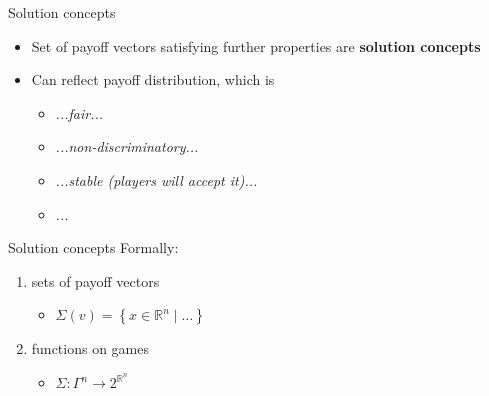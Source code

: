 \documentclass{beamer}
\newcommand{\Rn}[1][n]{\mathbb{R}^{#1}}
\begin{document}

\begin{frame}{Solution concepts}
	\begin{itemize}
	    \item<2-> Set of payoff vectors satisfying further properties are \textbf{solution concepts}
	    \item<3-> Can reflect payoff distribution, which is
	    \begin{itemize}
	        \item<4-> \textit{...fair...}
	        \item<4-> \textit{...non-discriminatory...}
	        \item<4-> \textit{...stable (players will accept it)...} 
	        \item<4-> \textit{...}
	    \end{itemize}
	\end{itemize}
\end{frame}



\begin{frame}{Solution concepts}
    Formally:
	\begin{enumerate}
	    \item<2-> sets of payoff vectors 
	    \begin{itemize}
	        \item<3-> $\Sigma(v) = \left\{x \in \Rn \mid \dots\right\}$
	    \end{itemize}
	    \item<4-> functions on games
	    \begin{itemize}
	        \item<5-> $\Sigma \colon \Gamma^n \to 2^{\Rn}$
	    \end{itemize}
	\end{enumerate}
\end{frame}


\end{document}
